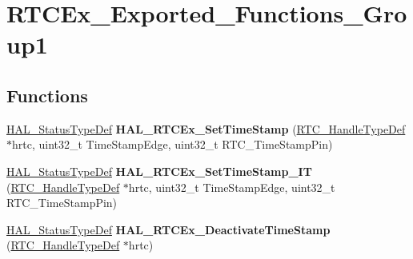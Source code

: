 \hypertarget{group___r_t_c_ex___exported___functions___group1}{}\section{R\+T\+C\+Ex\+\_\+\+Exported\+\_\+\+Functions\+\_\+\+Group1}
\label{group___r_t_c_ex___exported___functions___group1}
\subsection*{Functions}
\begin{DoxyCompactItemize}
\item 
\mbox{\label{group___r_t_c_ex___exported___functions___group1_ga750db6ed8e6afde87530736826554019}} 
\hyperlink{stm32f4xx__hal__def_8h_a63c0679d1cb8b8c684fbb0632743478f}{H\+A\+L\+\_\+\+Status\+Type\+Def} {\bfseries H\+A\+L\+\_\+\+R\+T\+C\+Ex\+\_\+\+Set\+Time\+Stamp} (\hyperlink{struct_r_t_c___handle_type_def}{R\+T\+C\+\_\+\+Handle\+Type\+Def} $\ast$hrtc, uint32\+\_\+t Time\+Stamp\+Edge, uint32\+\_\+t R\+T\+C\+\_\+\+Time\+Stamp\+Pin)
\item 
\mbox{\label{group___r_t_c_ex___exported___functions___group1_ga96faf756e9e07d06ff1d7b696c21a6a4}} 
\hyperlink{stm32f4xx__hal__def_8h_a63c0679d1cb8b8c684fbb0632743478f}{H\+A\+L\+\_\+\+Status\+Type\+Def} {\bfseries H\+A\+L\+\_\+\+R\+T\+C\+Ex\+\_\+\+Set\+Time\+Stamp\+\_\+\+IT} (\hyperlink{struct_r_t_c___handle_type_def}{R\+T\+C\+\_\+\+Handle\+Type\+Def} $\ast$hrtc, uint32\+\_\+t Time\+Stamp\+Edge, uint32\+\_\+t R\+T\+C\+\_\+\+Time\+Stamp\+Pin)
\item 
\mbox{\label{group___r_t_c_ex___exported___functions___group1_ga1d7152fccc39480de86c555c94e222a0}} 
\hyperlink{stm32f4xx__hal__def_8h_a63c0679d1cb8b8c684fbb0632743478f}{H\+A\+L\+\_\+\+Status\+Type\+Def} {\bfseries H\+A\+L\+\_\+\+R\+T\+C\+Ex\+\_\+\+Deactivate\+Time\+Stamp} (\hyperlink{struct_r_t_c___handle_type_def}{R\+T\+C\+\_\+\+Handle\+Type\+Def} $\ast$hrtc)
\item 
\mbox{\label{group___r_t_c_ex___exported___functions___group1_ga68d83277bafa5fcebd10f1bd83ef059e}} 

\end{DoxyCompactItemize}
